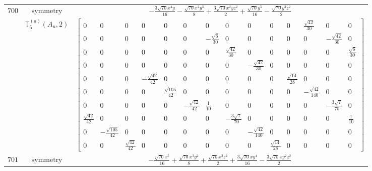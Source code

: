 \documentclass[fleqn,8pt,landscape]{jsarticle}
\begin{document}
\begin{longtable}{ccc}
$ 700 $ & $ \text{symmetry} $ & $ - \frac{3 \sqrt{70} x^{4} y}{16} - \frac{\sqrt{70} x^{2} y^{3}}{8} + \frac{3 \sqrt{70} x^{2} y z^{2}}{2} + \frac{\sqrt{70} y^{5}}{16} - \frac{\sqrt{70} y^{3} z^{2}}{2} $ \\
$  $ & $ \mathbb{T}_{5}^{(a)}(A_{u},2) $ & $ \begin{bmatrix} 0 & 0 & 0 & 0 & 0 & 0 & 0 & 0 & 0 & 0 & 0 & \frac{\sqrt{42}}{30} & 0 & 0 \\ 0 & 0 & 0 & 0 & 0 & 0 & - \frac{\sqrt{6}}{30} & 0 & 0 & 0 & 0 & 0 & - \frac{\sqrt{42}}{30} & 0 \\ 0 & 0 & 0 & 0 & 0 & 0 & 0 & \frac{\sqrt{42}}{30} & 0 & 0 & 0 & 0 & 0 & \frac{\sqrt{6}}{30} \\ 0 & 0 & 0 & 0 & 0 & 0 & 0 & 0 & - \frac{\sqrt{42}}{30} & 0 & 0 & 0 & 0 & 0 \\ 0 & 0 & 0 & - \frac{\sqrt{42}}{42} & 0 & 0 & 0 & 0 & 0 & 0 & \frac{\sqrt{14}}{28} & 0 & 0 & 0 \\ 0 & 0 & 0 & 0 & \frac{\sqrt{105}}{42} & 0 & 0 & 0 & 0 & 0 & 0 & - \frac{\sqrt{42}}{140} & 0 & 0 \\ 0 & 0 & 0 & 0 & 0 & - \frac{\sqrt{42}}{42} & \frac{1}{10} & 0 & 0 & 0 & 0 & 0 & - \frac{3 \sqrt{7}}{70} & 0 \\ \frac{\sqrt{42}}{42} & 0 & 0 & 0 & 0 & 0 & 0 & - \frac{3 \sqrt{7}}{70} & 0 & 0 & 0 & 0 & 0 & \frac{1}{10} \\ 0 & - \frac{\sqrt{105}}{42} & 0 & 0 & 0 & 0 & 0 & 0 & - \frac{\sqrt{42}}{140} & 0 & 0 & 0 & 0 & 0 \\ 0 & 0 & \frac{\sqrt{42}}{42} & 0 & 0 & 0 & 0 & 0 & 0 & \frac{\sqrt{14}}{28} & 0 & 0 & 0 & 0 \end{bmatrix} $ \\ \hline
$ 701 $ & $ \text{symmetry} $ & $ - \frac{\sqrt{70} x^{5}}{16} + \frac{\sqrt{70} x^{3} y^{2}}{8} + \frac{\sqrt{70} x^{3} z^{2}}{2} + \frac{3 \sqrt{70} x y^{4}}{16} - \frac{3 \sqrt{70} x y^{2} z^{2}}{2} $ \\

\end{longtable}
\end{document}
